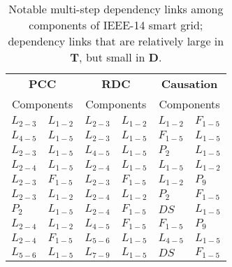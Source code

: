 \begin{table}[H]
\centering
\caption{Notable multi-step dependency links among components of IEEE-14 smart grid; dependency links that are relatively large in $\mathbf{T}$, but small in $\mathbf{D}$.}
\label{tab:t_ieee14}
\footnotesize
\begin{tabular}{l@{ - }l|l@{ - }l|l@{ - }l}
\multicolumn{2}{c}{\textbf{PCC}} & \multicolumn{2}{c}{\textbf{RDC}} & \multicolumn{2}{c}{\textbf{Causation}} \\
\multicolumn{2}{c|}{Components} & \multicolumn{2}{c|}{Components} & \multicolumn{2}{c}{Components} \\ \hline
$L_{2-3}$ & $L_{1-2}$ & $L_{2-3}$ & $L_{1-2}$ & $L_{1-2}$ & $F_{1-5}$ \\
$L_{4-5}$ & $L_{1-5}$ & $L_{2-3}$ & $L_{1-5}$ & $F_{1-5}$ & $L_{1-5}$ \\
$L_{2-3}$ & $L_{1-5}$ & $L_{4-5}$ & $L_{1-5}$ & $P_{2}$ & $L_{1-5}$ \\
$L_{2-4}$ & $L_{1-5}$ & $L_{2-4}$ & $L_{1-5}$ & $L_{1-5}$ & $L_{1-2}$ \\
$L_{2-3}$ & $F_{1-5}$ & $L_{2-3}$ & $F_{1-5}$ & $L_{1-2}$ & $P_{9}$ \\
$L_{2-3}$ & $L_{1-2}$ & $L_{2-4}$ & $L_{1-2}$ & $P_{2}$ & $F_{1-5}$ \\
$P_{2}$ & $L_{1-5}$ & $L_{2-4}$ & $F_{1-5}$ & $DS$ & $L_{1-5}$ \\
$L_{2-4}$ & $L_{1-2}$ & $L_{4-5}$ & $F_{1-5}$ & $F_{1-5}$ & $P_{9}$ \\
$L_{2-4}$ & $F_{1-5}$ & $L_{5-6}$ & $L_{1-5}$ & $L_{4-5}$ & $L_{1-5}$ \\
$L_{5-6}$ & $L_{1-5}$ & $L_{7-9}$ & $L_{1-5}$ & $DS$ & $F_{1-5}$
\end{tabular}
\end{table}

